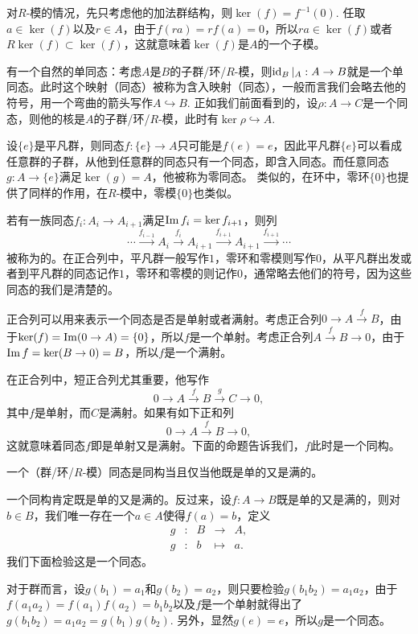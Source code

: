 对$R$-模的情况，先只考虑他的加法群结构，则$\ker(f)=f^{-1}(0)$. 任取$a\in \ker(f)$以及$r\in A$，由于$f(ra)=rf(a)=0$，所以$ra\in \ker(f)$或者$R\ker(f)\subset \ker(f)$，这就意味着$\ker(f)$是$A$的一个子模。

\para 有一个自然的单同态：考虑$A$是$B$的子群/环/$R$-模，则$\operatorname{id}_B|_A:A\to B$就是一个单同态。此时这个映射（同态）被称为含入映射（同态），一般而言我们会略去他的符号，用一个弯曲的箭头写作$A\hookrightarrow B$. 正如我们前面看到的，设$\rho:A\to C$是一个同态，则他的核是$A$的子群/环/$R$-模，此时有$\ker\rho\hookrightarrow A$.

设$\{e\}$是平凡群，则同态$f:\{e\}\to A$只可能是$f(e)=e$，因此平凡群$\{e\}$可以看成任意群的子群，从他到任意群的同态只有一个同态，即含入同态。而任意同态$g:A\to \{e\}$满足$\ker(g)=A$，他被称为零同态。 类似的，在环中，零环$\{0\}$也提供了同样的作用，在$R$-模中，零模$\{0\}$也类似。

\para 若有一族同态$f_i:A_i\to A_{i+1}$满足$\operatorname{Im} f_i=\ker f_{i+1}$，则列
\[
	\cdots \xrightarrow{f_{i-1}}A_i \xrightarrow{f_i} A_{i+1} \xrightarrow{f_{i+1}} A_{i+1}\xrightarrow{f_{i+1}}\cdots
\]
被称为的。在正合列中，平凡群一般写作$1$，零环和零模则写作$0$，从平凡群出发或者到平凡群的同态记作$1$，零环和零模的则记作$0$，通常略去他们的符号，因为这些同态的我们是清楚的。

正合列可以用来表示一个同态是否是单射或者满射。考虑正合列$0\to A\xrightarrow{f} B$，由于$\ker(f)=\operatorname{Im}(0\to A)=\{0\}$，所以$f$是一个单射。考虑正合列$A\xrightarrow{f} B\to 0$，由于$\operatorname{Im} f=\ker(B\to 0)=B$，所以$f$是一个满射。

在正合列中，短正合列尤其重要，他写作
\[
	0\to A \xrightarrow{f} B \xrightarrow{g} C\to 0,
\]
其中$f$是单射，而$C$是满射。如果有如下正和列
\[
	0\to A \xrightarrow{f} B \to 0,
\]
这就意味着同态$f$即是单射又是满射。下面的命题告诉我们，$f$此时是一个同构。

\pro 一个（群/环/$R$-模）同态是同构当且仅当他既是单的又是满的。

\proof 一个同构肯定既是单的又是满的。反过来，设$f: A\to B$既是单的又是满的，则对$b\in B$，我们唯一存在一个$a\in A$使得$f(a)=b$，定义
\[
	\begin{array}{ccccc}
		g &:&B &\to& A,\\
		g &:&b &\mapsto& a.
	\end{array}
\]
我们下面检验这是一个同态。

对于群而言，设$g(b_1)=a_1$和$g(b_2)=a_2$，则只要检验$g(b_1b_2)=a_1a_2$，由于$f(a_1a_2)=f(a_1)f(a_2)=b_1b_2$以及$f$是一个单射就得出了$g(b_1b_2)=a_1a_2=g(b_1)g(b_2)$. 另外，显然$g(e)=e$，所以$g$是一个同态。

